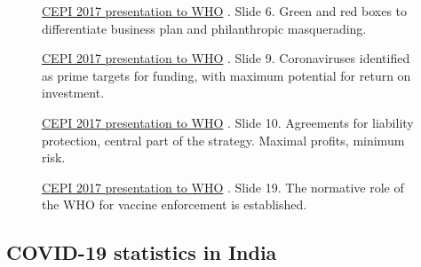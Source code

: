 \documentclass[11pt,a4paper,notitlepage]{report}
\begin{document}
\begin{figure}[h]
    \centering
    \caption{\href{https://www.who.int/medicines/ebola-treatment/TheCoalitionEpidemicPreparednessInnovations-an-overview.pdf}{CEPI 2017 presentation to WHO} \cite{cepi072017}. Slide 6. Green and red boxes to differentiate business plan and philanthropic masquerading.}
    \label{fig:CEPI-slide-6}
\end{figure}

\begin{figure}[h]
    \centering
    \caption{\href{https://www.who.int/medicines/ebola-treatment/TheCoalitionEpidemicPreparednessInnovations-an-overview.pdf}{CEPI 2017 presentation to WHO} \cite{cepi072017}. Slide 9. Coronaviruses identified as prime targets for funding, with maximum potential for return on investment.}
    \label{fig:CEPI-slide-9}
\end{figure}

\begin{figure}[h]
    \centering
    \caption{\href{https://www.who.int/medicines/ebola-treatment/TheCoalitionEpidemicPreparednessInnovations-an-overview.pdf}{CEPI 2017 presentation to WHO} \cite{cepi072017}. Slide 10. Agreements for liability protection, central part of the strategy. Maximal profits, minimum risk.}
    \label{fig:CEPI-slide-10}
\end{figure}

\begin{figure}[h]
    \centering
    \caption{\href{https://www.who.int/medicines/ebola-treatment/TheCoalitionEpidemicPreparednessInnovations-an-overview.pdf}{CEPI 2017 presentation to WHO} \cite{cepi072017}. Slide 19. The normative role of the WHO for vaccine enforcement is established.}
    \label{fig:CEPI-slide-19}
\end{figure}

\clearpage

\subsection*{COVID-19 statistics in India}

\end{document}
